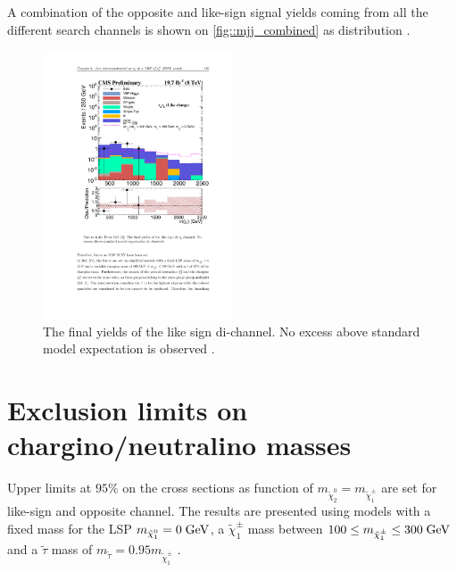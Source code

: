 A combination of the opposite and like-sign signal yields coming from all the different search channels is shown on \autoref{fig::mjj_combined} as \mjj distribution \cite{Khachatryan:2015kxa}.

\begin{figure}[!h]
	\centering
	\includegraphics[width=0.5\textwidth]{analysis/pics/mjj_combined.pdf}
	\caption{The final yields of the like sign di-\hadtau channel. No excess above standard model expectation is observed \cite{Khachatryan:2015kxa}.}
	\label{fig::mjj_combined}
\end{figure}

\section{Exclusion limits on chargino/neutralino masses}

Upper limits at $95\%$ on the cross sections as function of $m_{\tilde{\chi}_{2}^{0}}=m_{\tilde{\chi}_{1}^{\pm}}$ are set for like-sign and opposite channel. The results are presented using models with a fixed mass for the LSP $m_{\tilde{\chi}_{1}^{0}} = 0\;\text{Ge}\kern-0.06667em\text{V}$, a $\tilde{\chi}_{1}^{\pm}$ mass between $100 \leq m_{\tilde{\chi}_{1}^{\pm}} \leq 300\;\text{Ge}\kern-0.06667em\text{V}$ and a $\tilde{\tau}$ mass of $m_{\tilde{\tau}} = 0.95 m_{\tilde{\chi}_{1}^{\pm}}$ .

